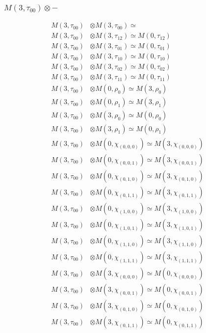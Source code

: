 \subsubsection{$ M(3,\tau_{00})\otimes -$}
\begin{align*}
M(3,\tau_{00}) &\otimes M(3,\tau_{00}) \simeq  \\
M(3,\tau_{00}) &\otimes M(3,\tau_{12}) \simeq M(0,\tau_{12}) \\
M(3,\tau_{00}) &\otimes M(3,\tau_{01}) \simeq M(0,\tau_{01}) \\
M(3,\tau_{00}) &\otimes M(3,\tau_{10}) \simeq M(0,\tau_{10}) \\
M(3,\tau_{00}) &\otimes M(3,\tau_{02}) \simeq M(0,\tau_{02}) \\
M(3,\tau_{00}) &\otimes M(3,\tau_{11}) \simeq M(0,\tau_{11}) \\
M(3,\tau_{00}) &\otimes M(0,\rho_{0}) \simeq M(3,\rho_{0}) \\
M(3,\tau_{00}) &\otimes M(0,\rho_{1}) \simeq M(3,\rho_{1}) \\
M(3,\tau_{00}) &\otimes M(3,\rho_{0}) \simeq M(0,\rho_{0}) \\
M(3,\tau_{00}) &\otimes M(3,\rho_{1}) \simeq M(0,\rho_{1}) \\
M(3,\tau_{00}) &\otimes M(0,\chi_{(0,0,0)}) \simeq M(3,\chi_{(0,0,0)}) \\
M(3,\tau_{00}) &\otimes M(0,\chi_{(0,0,1)}) \simeq M(3,\chi_{(0,0,1)}) \\
M(3,\tau_{00}) &\otimes M(0,\chi_{(0,1,0)}) \simeq M(3,\chi_{(0,1,0)}) \\
M(3,\tau_{00}) &\otimes M(0,\chi_{(0,1,1)}) \simeq M(3,\chi_{(0,1,1)}) \\
M(3,\tau_{00}) &\otimes M(0,\chi_{(1,0,0)}) \simeq M(3,\chi_{(1,0,0)}) \\
M(3,\tau_{00}) &\otimes M(0,\chi_{(1,0,1)}) \simeq M(3,\chi_{(1,0,1)}) \\
M(3,\tau_{00}) &\otimes M(0,\chi_{(1,1,0)}) \simeq M(3,\chi_{(1,1,0)}) \\
M(3,\tau_{00}) &\otimes M(0,\chi_{(1,1,1)}) \simeq M(3,\chi_{(1,1,1)}) \\
M(3,\tau_{00}) &\otimes M(3,\chi_{(0,0,0)}) \simeq M(0,\chi_{(0,0,0)}) \\
M(3,\tau_{00}) &\otimes M(3,\chi_{(0,0,1)}) \simeq M(0,\chi_{(0,0,1)}) \\
M(3,\tau_{00}) &\otimes M(3,\chi_{(0,1,0)}) \simeq M(0,\chi_{(0,1,0)}) \\
M(3,\tau_{00}) &\otimes M(3,\chi_{(0,1,1)}) \simeq M(0,\chi_{(0,1,1)}) \\

\end{align*}
